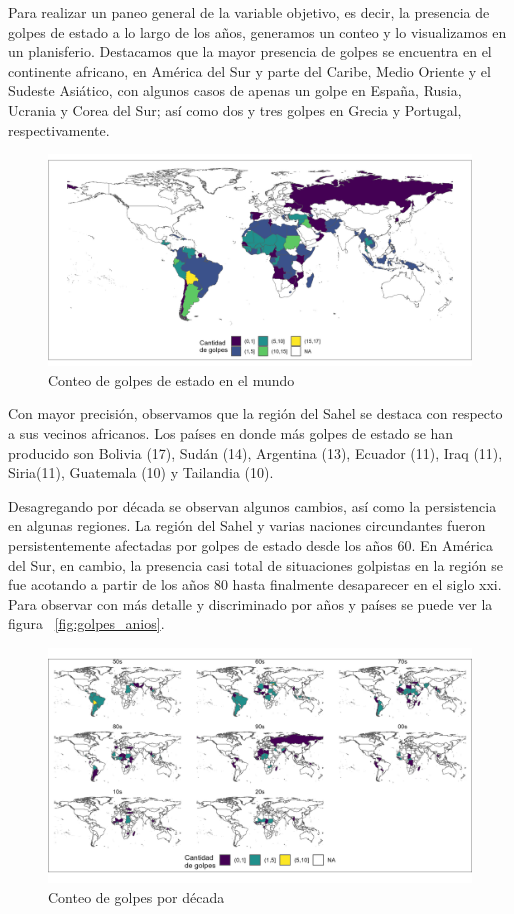 \documentclass{article}
\begin{document}
Para realizar un paneo general de la variable objetivo, es decir, la presencia de
golpes de estado a lo largo de los años, generamos un conteo y lo visualizamos en un 
planisferio. Destacamos que la mayor presencia de golpes se encuentra en el 
continente africano, en América del Sur y parte del Caribe, Medio Oriente y el 
Sudeste Asiático, con algunos casos de apenas un golpe en España, Rusia, Ucrania 
y Corea del Sur; así como dos y tres golpes en Grecia y Portugal, respectivamente.

\begin{figure}[H]
  \centering  
  \includegraphics[width=1\textwidth]{2_golpes.png}
  \caption{Conteo de golpes de estado en el mundo\label{fig::mapa_golpes}}
\end{figure}

Con mayor precisión, observamos que la región del Sahel se destaca con respecto a sus
vecinos africanos. Los países en donde más golpes de estado se han producido son
Bolivia (17), Sudán (14), Argentina (13), Ecuador (11), Iraq (11), Siria(11), 
Guatemala (10) y Tailandia (10).

Desagregando por década se observan algunos cambios, así como la persistencia en 
algunas regiones. La región del Sahel y varias naciones circundantes fueron 
persistentemente afectadas por golpes de estado desde los años 60. En América del 
Sur, en cambio, la presencia casi total de situaciones golpistas en la región se 
fue acotando a partir de los años 80 hasta finalmente desaparecer en el siglo 
xxi. Para observar con más detalle y discriminado por años y países se puede ver 
la figura ~\ref{fig:golpes_anios}.

\begin{figure}[H]
  \centering  
  \includegraphics[width=1\textwidth]{3_golpes_decadas.png}
  \caption{Conteo de golpes por década}
\end{figure}
\end{document}
